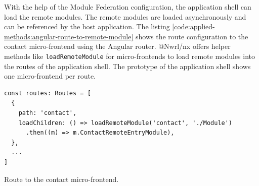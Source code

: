 \noindent With the help of the Module Federation configuration, the application shell can load the remote modules. The remote modules are loaded asynchronously and can be referenced by the host application. The listing \ref{code:applied-methods:angular-route-to-remote-module} shows the route configuration to the contact micro-frontend using the Angular router. @Nwrl/nx offers helper methods like \texttt{loadRemoteModule} for micro-frontends to load remote modules into the routes of the application shell. The prototype of the application shell shows one micro-frontend per route.

\ifshowListings
\begin{listing}[H]
    \begin{verbatim}
const routes: Routes = [
  {
    path: 'contact',
    loadChildren: () => loadRemoteModule('contact', './Module')
      .then((m) => m.ContactRemoteEntryModule),
  },
  ...
]
    \end{verbatim}
    \caption{Route to the contact micro-frontend.}\label{code:applied-methods:angular-route-to-remote-module}
\end{listing}
\fi

\ifshowAppliedMethodsCustomNginxConfSection
  
\fi





\ifshowAppliedMethodsLoadRemoteSettingsSection
  
\fi

\ifshowAppliedMethodsSecondaryEntrypoints
  
\fi